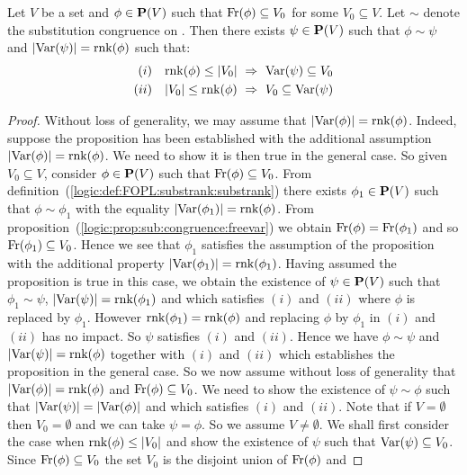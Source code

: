 \begin{prop}\label{logic:prop:FOPL:substrank:changeofvar}
Let $V$ be a set and $\phi\in\mbox{${\bf P}(V)$}$ such that $\mbox{\rm Fr}(\phi)\subseteq
V_{0}$ for some $V_{0}\subseteq V$.  Let $\sim$ denote the
substitution congruence on \pv. Then there exists $\psi\in\mbox{${\bf P}(V)$}$ such
that $\phi\sim\psi$ and $|\mbox{\rm Var}(\psi)|=\mbox{\rm rnk}(\phi)$ such that:
    \begin{eqnarray*}
    (i)&&\mbox{\rm rnk}(\phi)\leq|V_{0}|\ \Rightarrow\ \mbox{\rm Var}(\psi)\subseteq
    V_{0}\\
    (ii)&&|V_{0}|\leq\mbox{\rm rnk}(\phi)\ \Rightarrow\
    V_{0}\subseteq\mbox{\rm Var}(\psi)
    \end{eqnarray*}
\end{prop}
\begin{proof}
Without loss of generality, we may assume that
$|\mbox{\rm Var}(\phi)|=\mbox{\rm rnk}(\phi)$. Indeed, suppose the proposition has been
established with the additional assumption
$|\mbox{\rm Var}(\phi)|=\mbox{\rm rnk}(\phi)$. We need to show it is then true in the
general case. So given $V_{0}\subseteq V$, consider $\phi\in\mbox{${\bf P}(V)$}$
such that $\mbox{\rm Fr}(\phi)\subseteq V_{0}$. From
definition~(\ref{logic:def:FOPL:substrank:substrank}) there exists
$\phi_{1}\in\mbox{${\bf P}(V)$}$ such that $\phi\sim\phi_{1}$ with the equality
$|\mbox{\rm Var}(\phi_{1})|=\mbox{\rm rnk}(\phi)$. From
proposition~(\ref{logic:prop:sub:congruence:freevar}) we obtain
$\mbox{\rm Fr}(\phi)=\mbox{\rm Fr}(\phi_{1})$ and so $\mbox{\rm Fr}(\phi_{1})\subseteq
V_{0}$. Hence we see that $\phi_{1}$ satisfies the assumption of the
proposition with the additional property
$|\mbox{\rm Var}(\phi_{1})|=\mbox{\rm rnk}(\phi_{1})$. Having assumed the proposition is
true in this case, we obtain the existence of $\psi\in\mbox{${\bf P}(V)$}$ such that
$\phi_{1}\sim\psi$, $|\mbox{\rm Var}(\psi)|=\mbox{\rm rnk}(\phi_{1})$ and which
satisfies $(i)$ and $(ii)$ where $\phi$ is replaced by $\phi_{1}$.
However $\mbox{\rm rnk}(\phi_{1})=\mbox{\rm rnk}(\phi)$ and replacing $\phi$ by
$\phi_{1}$ in $(i)$ and $(ii)$ has no impact. So $\psi$ satisfies
$(i)$ and $(ii)$. Hence we have $\phi\sim\psi$ and
$|\mbox{\rm Var}(\psi)|=\mbox{\rm rnk}(\phi)$ together with $(i)$ and $(ii)$ which
establishes the proposition in the general case. So we now assume
without loss of generality that $|\mbox{\rm Var}(\phi)|=\mbox{\rm rnk}(\phi)$ and
$\mbox{\rm Fr}(\phi)\subseteq V_{0}$. We need to show the existence of
$\psi\sim\phi$ such that $|\mbox{\rm Var}(\psi)|=|\mbox{\rm Var}(\phi)|$ and which
satisfies $(i)$ and $(ii)$. Note that if $V=\emptyset$  then
$V_{0}=\emptyset$ and we can take $\psi=\phi$. So we assume
$V\neq\emptyset$. We shall first consider the case when
$\mbox{\rm rnk}(\phi)\leq |V_{0}|$ and show the existence of $\psi$ such that
$\mbox{\rm Var}(\psi)\subseteq V_{0}$. Since $\mbox{\rm Fr}(\phi)\subseteq V_{0}$ the
set $V_{0}$ is the disjoint union of $\mbox{\rm Fr}(\phi)$ and

\end{proof}
